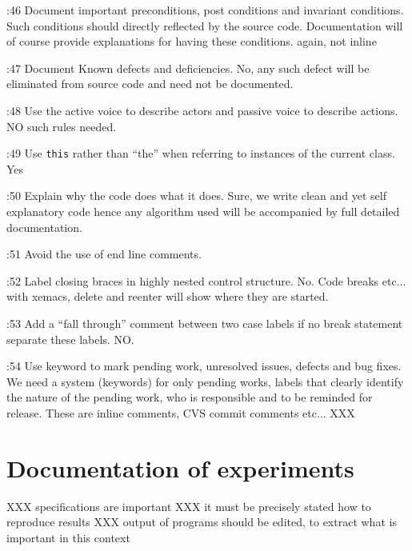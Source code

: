 \documentclass{book}
\newcommand{\name}[1]{\texttt{#1}}
\begin{document}
\cite{OKL_MisfeldtBumgardnerGray2004CppStyle}:46 Document important preconditions, post conditions and invariant conditions. Such conditions should directly reflected by the source code. Documentation will of course provide explanations for having these conditions. again, not inline

\cite{OKL_MisfeldtBumgardnerGray2004CppStyle}:47 Document Known defects and deficiencies. No, any such defect will be eliminated from source code and need not be documented. 

\cite{OKL_MisfeldtBumgardnerGray2004CppStyle}:48 Use the active voice to describe actors and passive voice to describe actions. NO such rules needed. 

\cite{OKL_MisfeldtBumgardnerGray2004CppStyle}:49 Use \name{this} rather than ``the'' when referring to instances of the current class. Yes

\cite{OKL_MisfeldtBumgardnerGray2004CppStyle}:50 Explain why the code does what it does. Sure, we write clean and yet self explanatory code hence any algorithm used will be accompanied by full detailed documentation.

\cite{OKL_MisfeldtBumgardnerGray2004CppStyle}:51 Avoid the use of end line comments. 

\cite{OKL_MisfeldtBumgardnerGray2004CppStyle}:52 Label closing braces in highly nested control structure. No. Code breaks etc... with xemacs, delete and reenter will show where they are started.

\cite{OKL_MisfeldtBumgardnerGray2004CppStyle}:53 Add a ``fall through'' comment between two case labels if no break statement separate these labels. NO.

\cite{OKL_MisfeldtBumgardnerGray2004CppStyle}:54 Use keyword to mark pending work, unresolved issues, defects and bug fixes.  We need a system (keywords) for only pending works, labels that clearly identify the nature of the pending work, who is responsible and to be reminded for release. These are inline comments, CVS commit comments etc... XXX


\section{Documentation of experiments}
\label{sec:Documentationexperiments}

XXX specifications are important XXX it must be precisely stated how to reproduce results XXX output of programs should be edited, to extract what is important in this context
\end{document}
